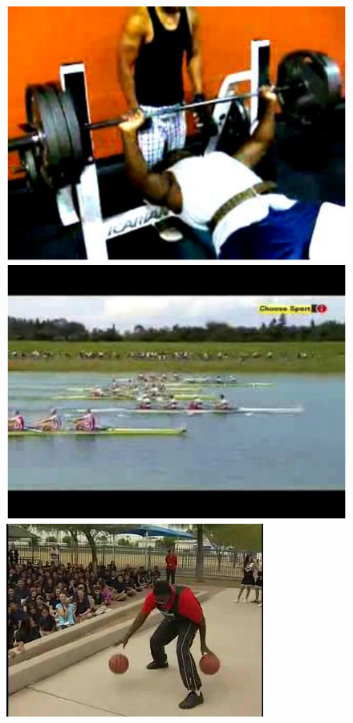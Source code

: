 \documentclass[10pt,twocolumn,letterpaper]{article}
\begin{document}
\begin{figure}[!t]
\begin{center}
\includegraphics[scale=0.25]{figures/dataset_thumb/ucf/crop_class5.pdf} 
\includegraphics[scale=0.25]{figures/dataset_thumb/ucf/crop_class6.pdf} \\
\includegraphics[scale=0.19]{figures/dataset_thumb/hmdb/class1.png}

\end{center}
\end{figure}
\end{document}
